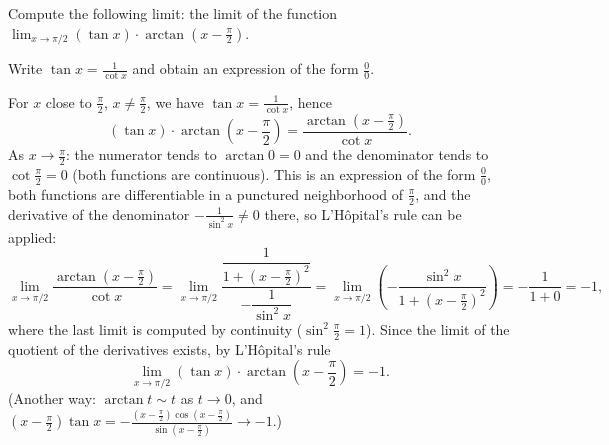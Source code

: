 
\begin{question}
Compute the following limit:
the limit of the function $\displaystyle \lim_{x\to\pi/2}(\tan x)\cdot\arctan\left(x-\frac{\pi}{2}\right)$.
\end{question}

\begin{hint}
Write $\tan x=\frac{1}{\cot x}$ and obtain an expression of the form $\frac00$.
\end{hint}

\begin{solution}
For $x$ close to $\frac\pi2$, $x\neq\frac\pi2$, we have $\tan x=\frac{1}{\cot x}$, hence
\[ (\tan x)\cdot\arctan\left(x-\frac{\pi}{2}\right)=\frac{\arctan\left(x-\frac{\pi}{2}\right)}{\cot x}. \]
As $x\to\frac\pi2$: the numerator tends to $\arctan 0=0$ and the denominator tends to $\cot\frac\pi2=0$ (both functions are continuous). This is an expression of the form $\frac00$, both functions are differentiable in a punctured neighborhood of $\frac\pi2$, and the derivative of the denominator $-\frac{1}{\sin^2x}\neq 0$ there, so L'Hôpital's rule can be applied:
\[ \lim_{x\to\pi/2}\frac{\arctan\left(x-\frac{\pi}{2}\right)}{\cot x}
   =\lim_{x\to\pi/2}\frac{\dfrac{1}{1+\left(x-\frac\pi2\right)^2}}{-\dfrac{1}{\sin^2x}}
   =\lim_{x\to\pi/2}\left(-\frac{\sin^2x}{1+\left(x-\frac\pi2\right)^2}\right)=-\frac{1}{1+0}=-1, \]
where the last limit is computed by continuity ($\sin^2\frac\pi2=1$). Since the limit of the quotient of the derivatives exists, by L'Hôpital's rule
\[ \lim_{x\to\pi/2}(\tan x)\cdot\arctan\left(x-\frac{\pi}{2}\right)=-1. \]
(Another way: $\arctan t\sim t$ as $t\to0$, and $(x-\frac\pi2)\tan x=-\frac{(x-\frac\pi2)\cos(x-\frac\pi2)}{\sin(x-\frac\pi2)}\to-1$.)
\end{solution}
